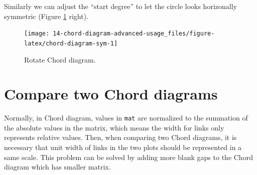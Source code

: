 \documentclass[]{book}
\newenvironment{Shaded}{\begin{snugshade}}{\end{snugshade}}
\newcommand{\KeywordTok}[1]{\textcolor[rgb]{0.13,0.29,0.53}{\textbf{#1}}}
\newcommand{\DataTypeTok}[1]{\textcolor[rgb]{0.13,0.29,0.53}{#1}}
\newcommand{\DecValTok}[1]{\textcolor[rgb]{0.00,0.00,0.81}{#1}}
\newcommand{\StringTok}[1]{\textcolor[rgb]{0.31,0.60,0.02}{#1}}
\newcommand{\OperatorTok}[1]{\textcolor[rgb]{0.81,0.36,0.00}{\textbf{#1}}}
\newcommand{\NormalTok}[1]{#1}
\theoremstyle{definition}
\theoremstyle{definition}
\theoremstyle{remark}
\begin{document}
Similarly we can adjust the ``start degree'' to let the circle looks
horizonally symmetric (Figure \ref{fig:chord-diagram-sym} right).

\begin{Shaded}
\end{Shaded}

\begin{figure}

{\centering \texttt{[image: 14-chord-diagram-advanced-usage\_files/figure-latex/chord-diagram-sym-1]} 

}

\caption{Rotate Chord diagram.}\label{fig:chord-diagram-sym}
\end{figure}

\section{Compare two Chord diagrams}\label{compare-two-chord-diagrams}

Normally, in Chord diagram, values in \texttt{mat} are normalized to the
summation of the absolute values in the matrix, which means the width
for links only represents relative values. Then, when comparing two
Chord diagrams, it is necessary that unit width of links in the two
plots should be represented in a same scale. This problem can be solved
by adding more blank gaps to the Chord diagram which has smaller matrix.
\end{document}

